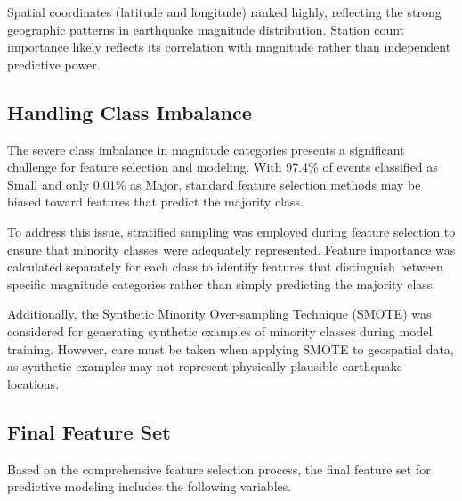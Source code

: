 Spatial coordinates (latitude and longitude) ranked highly, reflecting the strong geographic patterns in earthquake magnitude distribution. Station count importance likely reflects its correlation with magnitude rather than independent predictive power.

\subsection{Handling Class Imbalance}

The severe class imbalance in magnitude categories presents a significant challenge for feature selection and modeling. With 97.4\% of events classified as Small and only 0.01\% as Major, standard feature selection methods may be biased toward features that predict the majority class.

To address this issue, stratified sampling was employed during feature selection to ensure that minority classes were adequately represented. Feature importance was calculated separately for each class to identify features that distinguish between specific magnitude categories rather than simply predicting the majority class.

Additionally, the Synthetic Minority Over-sampling Technique (SMOTE) was considered for generating synthetic examples of minority classes during model training. However, care must be taken when applying SMOTE to geospatial data, as synthetic examples may not represent physically plausible earthquake locations.

\subsection{Final Feature Set}

Based on the comprehensive feature selection process, the final feature set for predictive modeling includes the following variables.

